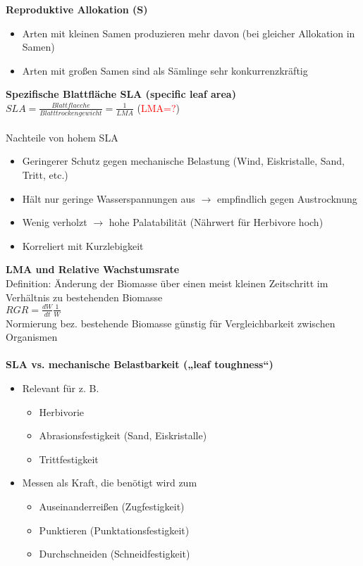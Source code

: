\newpage
\textbf{Reproduktive Allokation (S)}
\begin{itemize}
	\item Arten mit kleinen Samen produzieren mehr davon (bei gleicher Allokation in Samen)
	\item Arten mit großen Samen sind als Sämlinge sehr konkurrenzkräftig
\end{itemize}

\textbf{Spezifische Blattfläche SLA (specific leaf area)}\\
$SLA=\frac{Blattflaeche}{Blatttrockengewicht}=\frac{1}{LMA}$ (\textcolor{red}{LMA=?})\\\\

Nachteile von hohem SLA
\begin{itemize}
	\item Geringerer Schutz gegen mechanische Belastung (Wind, Eiskristalle, Sand, Tritt, etc.)
	\item Hält nur geringe Wasserspannungen aus $\rightarrow$ empfindlich gegen Austrocknung
	\item Wenig verholzt $\rightarrow$ hohe Palatabilität (Nährwert für Herbivore hoch)
	\item Korreliert mit Kurzlebigkeit
\end{itemize}

\textbf{LMA und Relative Wachstumsrate}\\
Definition: Änderung der Biomasse über einen meist kleinen Zeitschritt im Verhältnis zu bestehenden Biomasse\\
$RGR=\frac{dW}{dt}\frac{1}{W}$\\
Normierung bez. bestehende Biomasse günstig für Vergleichbarkeit zwischen Organismen
\\\\
\textbf{SLA vs. mechanische Belastbarkeit („leaf toughness“)}
\begin{itemize}
	\item Relevant für z. B.
	\begin{itemize}
		\item Herbivorie
		\item Abrasionsfestigkeit (Sand, Eiskristalle)
		\item Trittfestigkeit
	\end{itemize}
	\item Messen als Kraft, die benötigt wird zum
	\begin{itemize}
		\item Auseinanderreißen (Zugfestigkeit)
		\item Punktieren (Punktationsfestigkeit)
		\item  Durchschneiden (Schneidfestigkeit)
	\end{itemize}
\end{itemize}

